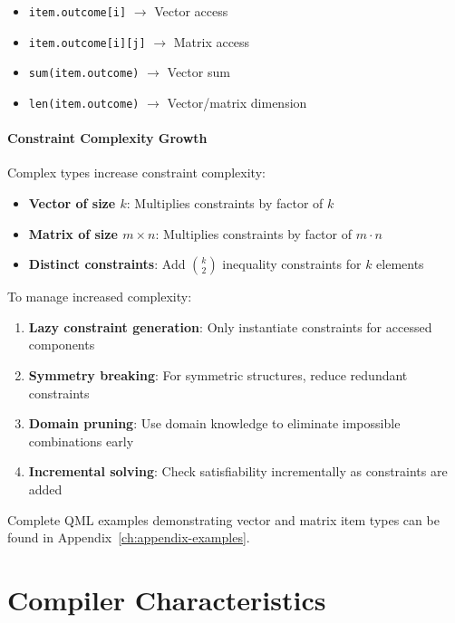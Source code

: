 \begin{itemize}
    \item \texttt{item.outcome[i]} $\rightarrow$ Vector access
    \item \texttt{item.outcome[i][j]} $\rightarrow$ Matrix access
    \item \texttt{sum(item.outcome)} $\rightarrow$ Vector sum
    \item \texttt{len(item.outcome)} $\rightarrow$ Vector/matrix dimension
\end{itemize}

\paragraph{Constraint Complexity Growth}

Complex types increase constraint complexity:

\begin{itemize}
    \item \textbf{Vector of size $k$}: Multiplies constraints by factor of $k$
    \item \textbf{Matrix of size $m \times n$}: Multiplies constraints by factor of $m \cdot n$
    \item \textbf{Distinct constraints}: Add $\binom{k}{2}$ inequality constraints for $k$ elements
\end{itemize}

To manage increased complexity:

\begin{enumerate}
    \item \textbf{Lazy constraint generation}: Only instantiate constraints for accessed components
    \item \textbf{Symmetry breaking}: For symmetric structures, reduce redundant constraints
    \item \textbf{Domain pruning}: Use domain knowledge to eliminate impossible combinations early
    \item \textbf{Incremental solving}: Check satisfiability incrementally as constraints are added
\end{enumerate}

Complete QML examples demonstrating vector and matrix item types can be found in Appendix~\ref{ch:appendix-examples}.

\section{Compiler Characteristics}

